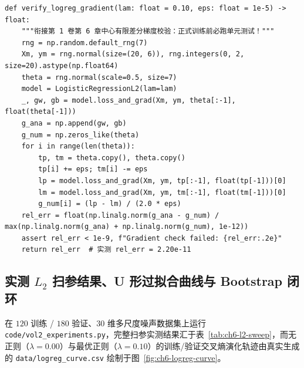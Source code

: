 \begin{lstlisting}[caption={纯 NumPy 端到端防泄漏逻辑回归流水线与有限差分梯度校验}, label={lst:ch6-pipeline}]
def verify_logreg_gradient(lam: float = 0.10, eps: float = 1e-5) -> float:
    """衔接第 1 卷第 6 章中心有限差分梯度校验：正式训练前必跑单元测试！"""
    rng = np.random.default_rng(7)
    Xm, ym = rng.normal(size=(20, 6)), rng.integers(0, 2, size=20).astype(np.float64)
    theta = rng.normal(scale=0.5, size=7)
    model = LogisticRegressionL2(lam=lam)
    _, gw, gb = model.loss_and_grad(Xm, ym, theta[:-1], float(theta[-1]))
    g_ana = np.append(gw, gb)
    g_num = np.zeros_like(theta)
    for i in range(len(theta)):
        tp, tm = theta.copy(), theta.copy()
        tp[i] += eps; tm[i] -= eps
        lp = model.loss_and_grad(Xm, ym, tp[:-1], float(tp[-1]))[0]
        lm = model.loss_and_grad(Xm, ym, tm[:-1], float(tm[-1]))[0]
        g_num[i] = (lp - lm) / (2.0 * eps)
    rel_err = float(np.linalg.norm(g_ana - g_num) / max(np.linalg.norm(g_ana) + np.linalg.norm(g_num), 1e-12))
    assert rel_err < 1e-9, f"Gradient check failed: {rel_err:.2e}"
    return rel_err  # 实测 rel_err = 2.20e-11
\end{lstlisting}

\subsection{实测 $L_2$ 扫参结果、U 形过拟合曲线与 Bootstrap 闭环}
\label{subsec:ch6-results}

在 $120$ 训练 / $180$ 验证、$30$ 维多尺度噪声数据集上运行 \texttt{code/vol2\_experiments.py}，完整扫参实测结果汇于表~\ref{tab:ch6-l2-sweep}，而无正则（$\lambda=0.00$）与最优正则（$\lambda=0.10$）的训练/验证交叉熵演化轨迹由真实生成的 \texttt{data/logreg\_curve.csv} 绘制于图~\ref{fig:ch6-logreg-curve}。

